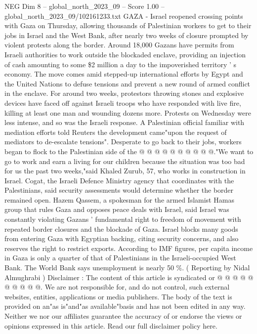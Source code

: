 \begin{textsample}{NEG Dim 8 – global\_north\_2023\_09 – Score 1.00 – global\_north\_2023\_09/102161233.txt}  \label{ex:f8_neg_154}
GAZA - Israel reopened crossing points with Gaza on Thursday, allowing thousands of Palestinian workers to get to their jobs in Israel and the West Bank, after nearly two weeks of closure prompted by violent protests along the border.
Around 18,000 Gazans have permits from Israeli authorities to work outside the blockaded enclave, providing an injection of cash amounting to some \$2 million a day to the impoverished territory ' s economy.
The move comes amid stepped-up international efforts by Egypt and the United Nations to defuse tensions and prevent a new round of armed conflict in the enclave.
For around two weeks, protestors throwing stones and explosive devices have faced off against Israeli troops who have responded with live fire, killing at least one man and wounding dozens more.
Protests on Wednesday were less intense, and so was the Israeli response.
A Palestinian official familiar with mediation efforts told Reuters the development came"upon the request of mediators to de-escalate tensions".
Desperate to go back to their jobs, workers began to flock to the Palestinian side of the @ @ @ @ @ @ @ @ @ @."We want to go to work and earn a living for our children because the situation was too bad for us the past two weeks,"said Khaled Zurub, 57, who works in construction in Israel.
Cogat, the Israeli Defence Ministry agency that coordinates with the Palestinians, said security assessments would determine whether the border remained open.
Hazem Qassem, a spokesman for the armed Islamist Hamas group that rules Gaza and opposes peace deals with Israel, said Israel was constantly violating Gazans ' fundamental right to freedom of movement with repeated border closures and the blockade of Gaza.
Israel blocks many goods from entering Gaza with Egyptian backing, citing security concerns, and also reserves the right to restrict exports.
According to IMF figures, per capita income in Gaza is only a quarter of that of Palestinians in the Israeli-occupied West Bank.
The World Bank says unemployment is nearly 50 \%. ( Reporting by Nidal Almughrabi ) Disclaimer : The content of this article is syndicated or @ @ @ @ @ @ @ @ @ @.
We are not responsible for, and do not control, such external websites, entities, applications or media publishers.
The body of the text is provided on an"as is"and"as available"basis and has not been edited in any way.
Neither we nor our affiliates guarantee the accuracy of or endorse the views or opinions expressed in this article.
Read our full disclaimer policy here.

\end{textsample}

